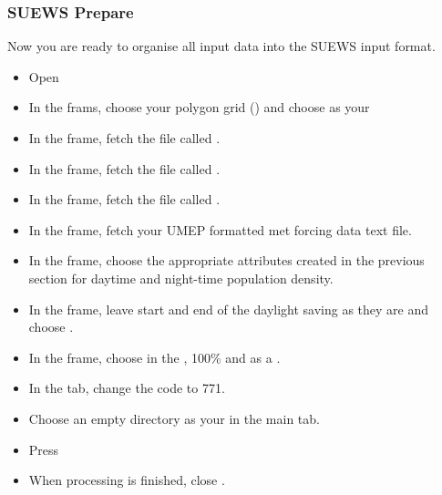\documentclass[letterpaper,10pt,english]{sphinxmanual}
\begin{document}
\subsubsection{SUEWS Prepare}
\label{\detokenize{Tutorials/SuewsSpatial:suews-prepare}}
Now you are ready to organise all input data into the SUEWS input format.
\begin{itemize}
\item {} 
Open 

\item {} 
In the  frams, choose your polygon grid () and choose  as your 

\item {} 
In the  frame, fetch the file called .

\item {} 
In the  frame, fetch the file called .

\item {} 
In the  frame, fetch the file called .

\item {} 
In the  frame, fetch your UMEP formatted met forcing data text file.

\item {} 
In the  frame, choose the appropriate attributes created in the previous section for daytime and night-time population density.

\item {} 
In the  frame, leave start and end of the daylight saving as they are and choose .

\item {} 
In the  frame, choose  in the , 100\%  and  as a .

\item {} 
In the  tab, change the code to 771.

\item {} 
Choose an empty directory as your  in the main tab.

\item {} 
Press 

\item {} 
When processing is finished, close .

\end{itemize}
\end{document}
